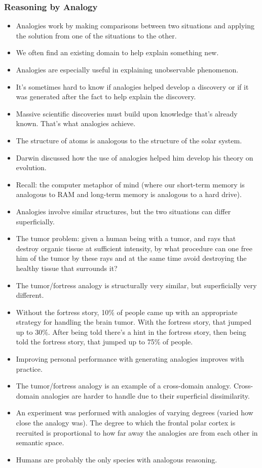\documentclass[]{article}
\newcommand{\lecture}[1]{\marginpar{{\footnotesize $\leftarrow$ \underline{#1}}}}
\begin{document}
			\subsubsection{Reasoning by Analogy}
				\begin{itemize}
					\item Analogies work by making comparisons between two situations and applying the solution from one of the situations to the other.
					\item We often find an existing domain to help explain something new.
					\item Analogies are especially useful in explaining unobservable phenomenon.
					\item It's sometimes hard to know if analogies helped develop a discovery or if it was generated after the fact to help explain the discovery.
					\item Massive scientific discoveries must build upon knowledge that's already known. That's what analogies achieve.
					\item The structure of atoms is analogous to the structure of the solar system.
					\item Darwin discussed how the use of analogies helped him develop his theory on evolution.
					\item Recall: the computer metaphor of mind (where our short-term memory is analogous to RAM and long-term memory is analogous to a hard drive).
					\item Analogies involve similar structures, but the two situations can differ superficially.
					\item The tumor problem: given a human being with a tumor, and rays that destroy organic tissue at sufficient intensity, by what procedure can one free him of the tumor by these rays and at the same time avoid destroying the healthy tissue that surrounds it?
					\item The tumor/fortress analogy is structurally very similar, but superficially very different.
					\item Without the fortress story, 10\% of people came up with an appropriate strategy for handling the brain tumor. With the fortress story, that jumped up to 30\%. After being told there's a hint in the fortress story, then being told the fortress story, that jumped up to 75\% of people.
					\item Improving personal performance with generating analogies improves with practice.
					\item The tumor/fortress analogy is an example of a cross-domain analogy. Cross-domain analogies are harder to handle due to their superficial dissimilarity. \lecture{March 21, 2013}
					\item An experiment was performed with analogies of varying degrees (varied how close the analogy was). The degree to which the frontal polar cortex is recruited is proportional to how far away the analogies are from each other in semantic space.
					\item Humans are probably the only species with analogous reasoning.
				\end{itemize}
\end{document}
